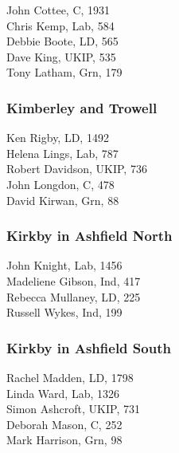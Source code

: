 \documentclass[a4paper,openany,10pt]{book}
\begin{document}


John Cottee, C, 1931\\
Chris Kemp, Lab, 584\\
Debbie Boote, LD, 565\\
Dave King, UKIP, 535\\
Tony Latham, Grn, 179\\


\subsubsection*{Kimberley and Trowell}



Ken Rigby, LD, 1492\\
Helena Lings, Lab, 787\\
Robert Davidson, UKIP, 736\\
John Longdon, C, 478\\
David Kirwan, Grn, 88\\


\subsubsection*{Kirkby in Ashfield North}



John Knight, Lab, 1456\\
Madeliene Gibson, Ind, 417\\
Rebecca Mullaney, LD, 225\\
Russell Wykes, Ind, 199\\


\subsubsection*{Kirkby in Ashfield South}



Rachel Madden, LD, 1798\\
Linda Ward, Lab, 1326\\
Simon Ashcroft, UKIP, 731\\
Deborah Mason, C, 252\\
Mark Harrison, Grn, 98\\
\end{document}
